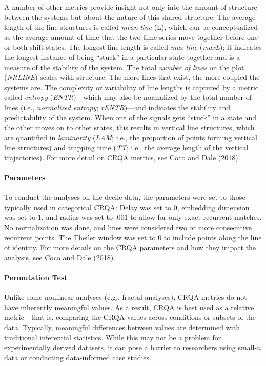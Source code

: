 \documentclass[english,man]{apa6}
\begin{document}
A number of other metrics provide insight not only into the amount of structure
between the systems but about the nature of this shared structure.
The average length of the line structures is called \emph{mean line} (L), which can
be conceptualized as the average amount of time that the two time series move
together before one or both shift states. The longest line length is called
\emph{max line} (\emph{maxL}); it indicates the longest instance of being \enquote{stuck} in a
particular state together and is a measure of the stability of the system.
The total \emph{number of lines} on the plot (\emph{NRLINE})
scales with structure: The more lines that exist, the more coupled the systems are. The
complexity or variability of line lengths is captured by a metric called
\emph{entropy} (\emph{ENTR})---which may also be normalized by the total number of lines
(i.e., \emph{normalized entropy}; \emph{rENTR})---and indicates
the stability and predictability of the system. When one of the signals gets
\enquote{stuck} in a state and the other moves on to other states, this results in
vertical line structures, which are quantified in \emph{laminarity} (\emph{LAM};
i.e., the proportion of points forming vertical line structures)
and trapping time (\emph{TT}; i.e., the average length of the
vertical trajectories). For more detail on CRQA metrics, see Coco and Dale (2018).

\hypertarget{parameters}{%
\paragraph{Parameters}\label{parameters}}

To conduct the analyses on the decile data, the parameters were set to those
typically used in categorical CRQA: Delay was set to \(0\), embedding dimension
was set to \(1\), and radius was set to \(.001\) to allow for only exact recurrent
matches. No normalization was done, and lines were considered two or more
consecutive recurrent points. The Theiler window was set to \(0\) to include
points along the line of identity. For more details on the CRQA parameters and
how they impact the analysis, see Coco and Dale (2018).

\hypertarget{permutation-test}{%
\paragraph{Permutation Test}\label{permutation-test}}

Unlike some nonlinear analyses (e.g., fractal analyses), CRQA metrics do not have
inherently meaningful values. As a result, CRQA is best used as a relative
metric---that is, comparing the CRQA values across conditions or subsets
of the data. Typically, meaningful differences between values are determined with
traditional inferential statistics. While this may not be a problem for
experimentally derived datasets, it can pose a barrier to researchers using
small-\(n\) data or conducting data-informed case studies.
\end{document}
